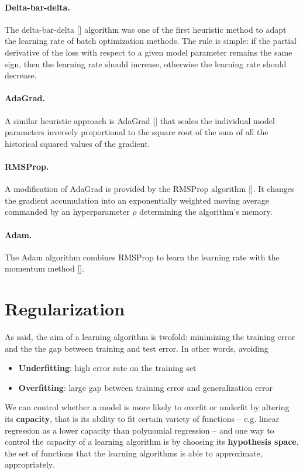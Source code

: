 \paragraph{Delta-bar-delta.} The delta-bar-delta [\cite{Jacobs1988}] algorithm was one of the first heuristic method to adapt the learning rate of batch optimization methods. The rule is simple: if the partial derivative of the loss with respect to a given model parameter remains the same sign, then the learning rate should increase, otherwise the learning rate should decrease. 

\paragraph{AdaGrad.} A similar heuristic approach is AdaGrad [\cite{Duchi2011}] that scales the individual model parameters inversely proportional to the square root of the sum of all the historical squared values of the gradient. 

\paragraph{RMSProp.} A modification of AdaGrad is provided by the RMSProp algorithm [\cite{Hinton2012}]. It changes the gradient accumulation into an exponentially weighted moving average commanded by an hyperparameter $\rho$ determining the algorithm's memory. 

\paragraph{Adam.} The Adam algorithm combines RMSProp to learn the learning rate with the momentum method [\cite{Adam2014}].


\section{Regularization} 
As said, the aim of a learning algorithm is twofold: minimizing the training error and the the gap between training and test error. In other words, avoiding
\begin{itemize}
    \item \textbf{Underfitting}: high error rate on the training set
    \item \textbf{Overfitting}: large gap between training error and generalization error
\end{itemize}
We can control whether a model is more likely to overfit or underfit by altering its \textbf{capacity}, that is its ability to fit certain variety of functions -- e.g. linear regression as a lower capacity than polynomial regression -- and one way to control the capacity of a learning algorithm is by choosing its \textbf{hypothesis space}, the set of functions that the learning algorithms is able to approximate, appropriately.

